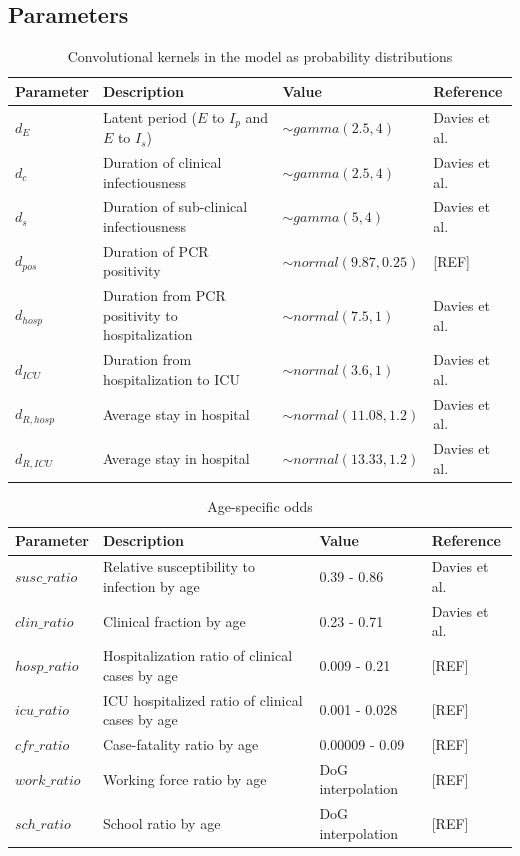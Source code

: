 \documentclass[12pt]{article}
\begin{document}
\newpage 
\subsection{Parameters}

\begin{center}
    \begin{table}[h]
    \caption{Convolutional kernels in the model as probability distributions}
    \centering
\begin{tabular}[H]{p{2cm}p{6cm}p{4cm}p{3cm}}
     \textbf{Parameter}& \textbf{Description}  & \textbf{Value}& \textbf{Reference} \\
     \midrule
     $d_E$ & Latent period ($E$ to $I_p$ and $E$ to $I_s$) & $\sim gamma(2.5,4)$ & Davies et al.\\
     $d_c$ & Duration of clinical infectiousness& $\sim gamma(2.5,4)$ &  Davies et al.\\
     $d_s$ & Duration of sub-clinical infectiousness& $\sim gamma(5,4)$ &  Davies et al.\\
     $d_{pos}$ & Duration of PCR positivity& $\sim normal(9.87, 0.25)$ & [REF]\\ 
     $d_{hosp}$ & Duration from PCR positivity to hospitalization& $\sim normal(7.5, 1)$ & Davies et al.\\ 
     $d_{ICU}$ & Duration from hospitalization to ICU& $\sim normal(3.6, 1)$ & Davies et al.\\ 
     $d_{R,hosp}$ & Average stay in hospital & $\sim normal(11.08, 1.2)$ & Davies et al.\\ 
     $d_{R,ICU}$ & Average stay in hospital & $\sim normal(13.33, 1.2)$ & Davies et al.
    \end{tabular}
\end{table}
\end{center}

\begin{center}
    \begin{table}[h]
    \caption{Age-specific odds}
    \centering
\begin{tabular}[H]{p{3cm}p{5cm}p{4cm}p{3cm}}
     \textbf{Parameter}& \textbf{Description}  & \textbf{Value}& \textbf{Reference} \\
     \midrule
     $susc\_ratio$ & Relative susceptibility to infection by age & 0.39 - 0.86 & Davies et al.\\
     $clin\_ratio$ & Clinical fraction by age &  0.23 - 0.71  &  Davies et al.\\
     $hosp\_ratio$ & Hospitalization ratio of clinical cases by age & 0.009 - 0.21 &  [REF]\\
     $icu\_ratio$ & ICU hospitalized ratio of clinical cases by age & 0.001 - 0.028 &  [REF]\\
     $cfr\_ratio$ & Case-fatality ratio by age& 0.00009 - 0.09 &  [REF]\\
     $work\_ratio$ & Working force ratio by age& DoG interpolation &  [REF]\\
     $sch\_ratio$ & School ratio by age & DoG interpolation &  [REF]
    \end{tabular}
\end{table}
\end{center}
\end{document}
